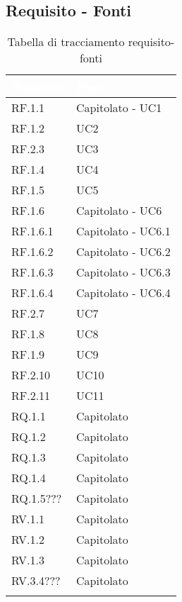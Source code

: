 \subsection{Requisito - Fonti}
\begin{center}
  \centering
  \begin{longtable}{|C{6cm}|C{6cm}|}
    \hline
    \textcolor[HTML]{FFFFFF}{\textbf{Requisito}} & \textcolor[HTML]{FFFFFF}{\textbf{Fonti}} \\ \hline
    RF.1.1 & Capitolato - UC1 \\ \hline
    RF.1.2 & UC2 \\ \hline
    RF.2.3 & UC3 \\ \hline
    RF.1.4 & UC4 \\ \hline
    RF.1.5 & UC5 \\ \hline
    RF.1.6 & Capitolato - UC6 \\ \hline
    RF.1.6.1 & Capitolato - UC6.1 \\ \hline
    RF.1.6.2 & Capitolato - UC6.2 \\ \hline
    RF.1.6.3 & Capitolato - UC6.3 \\ \hline
    RF.1.6.4 & Capitolato - UC6.4 \\ \hline
    RF.2.7 & UC7 \\ \hline
    RF.1.8 & UC8 \\ \hline
    RF.1.9 & UC9 \\ \hline
    RF.2.10 & UC10 \\ \hline
    RF.2.11 & UC11 \\ \hline
    RQ.1.1 & Capitolato \\ \hline
    RQ.1.2 & Capitolato \\ \hline
    RQ.1.3 & Capitolato \\ \hline
    RQ.1.4 & Capitolato \\ \hline
    RQ.1.5??? & Capitolato \\ \hline
    RV.1.1 & Capitolato \\ \hline
    RV.1.2 & Capitolato \\ \hline
    RV.1.3 & Capitolato \\ \hline
    RV.3.4??? & Capitolato \\ \hline

    \caption{Tabella di tracciamento requisito-fonti}
  \end{longtable}
\end{center}


